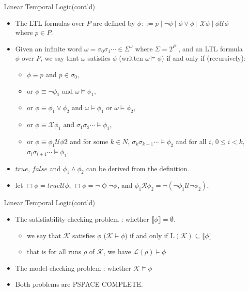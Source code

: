 \documentclass[12pt]{beamer}
\begin{document}
\begin{frame}{Linear Temporal Logic(cont'd)}
	\begin{itemize}
		\item The LTL formulas over $P$ are defined by $\phi ::= p \mid \neg\phi \mid \phi \lor \phi \mid \mathcal{X}\phi \mid \phi \mathcal{U} \phi$ where $p \in P$.
		\item Given an infinite word $\omega = \sigma_{0}\sigma_{1}\cdots \in \Sigma^{\omega}$ where $\Sigma = 2^{P}$ , and an LTL formula $\phi$ over $P$, we say that $\omega$ satisfies $\phi$ (written $\omega \models \phi$) if and only if (recursively):
		\begin{itemize}
			\item $\phi \equiv p$ and $p \in \sigma_{0}$,
			\item or $\phi \equiv \neg\phi_{1}$ and $\omega \models \phi_{1}$,
			\item or $\phi \equiv \phi_{1} \lor \phi_{2}$ and $\omega \models \phi_{1}$ or $\omega \models \phi_{2}$,
			\item or $\phi \equiv \mathcal{X}\phi_{1}$ and $\sigma_{1}\sigma_{2}\cdots \models \phi_{1}$,
			\item or $\phi \equiv \phi_{1}\mathcal{U}\phi{2}$ and for some $k \in N$, $\sigma_{k}\sigma_{k+1}\cdots \models \phi_{2}$ and for all $i$, $0 \leq i < k$,
$\sigma_{i}\sigma_{i+1}\cdots \models \phi_{1}$.
		\end{itemize}
		\item $true$, $false$ and $\phi_{1} \land \phi_{2}$ can be derived from the definition.
		\item let $\Box\phi = true\mathcal{U}\phi$, $\Box\phi =
\neg\Diamond\neg\phi$, and $\phi_{1}\mathcal{R}\phi_{2} = \neg(\neg\phi_{1}\mathcal{U}\neg\phi_{2})$.
	\end{itemize}
\end{frame}

\begin{frame}{Linear Temporal Logic(cont'd)}
	\begin{itemize}
		\item The satisfiability-checking problem : whether $\llbracket \phi \rrbracket = \emptyset$.
		\begin{itemize}
			\item we say that $\mathcal{K}$ satisfies $\phi$ ($\mathcal{K} \models \phi$) if and only if $\text{L}(\mathcal{K}) \subseteq \llbracket \phi \rrbracket$
			\item that is for all runs $\rho$ of $\mathcal{K}$, we have $\mathcal{L}(\rho) \models \phi$
		\end{itemize}
		\item The model-checking problem : whether $\mathcal{K} \models \phi$
		\item Both problems are PSPACE-COMPLETE.
	\end{itemize}
\end{frame}
\end{document}

